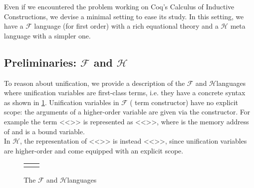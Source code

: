 \documentclass[sigconf,natbib=false,review]{acmart}
\newcommand{\llambda}{\ensuremath{\mathcal{L}}\xspace}
\newcommand{\Fo}{\texorpdfstring{\ensuremath{\mathcal{F}\xspace}}{F}} %
\newcommand{\Ho}{\texorpdfstring{\ensuremath{\mathcal{H}}\xspace}{H}}
\begin{document}
\newcommand{\maybeeta}{\texorpdfstring{\ensuremath{\Diamond\eta}\xspace}{maybeeta}}
\newcommand{\maybebeta}{\texorpdfstring{\ensuremath{\Diamond\beta}\xspace}{maybebeta}}
\newcommand{\notllambda}{\texorpdfstring{\ensuremath{\Diamond\llambda}\xspace}{maybellam}}

Even if we encountered the problem working on Coq's Calculus of Inductive
Constructions, we devise
a minimal setting to ease its study. In this setting, we have
a \Fo{} language (for first order) with a rich equational
theory and a \Ho{} meta language with a simpler one.


\subsection{Preliminaries: \Fo{} and \Ho{}}

To reason about unification, we provide a description of the
\Fo{} and \Ho languages where unification variables
are first-class terms, i.e. they have a concrete syntax as
shown in \cref{code:common-terms}.
Unification variables
in \Fo{} ( term constructor) have no explicit scope:
the arguments of a higher-order variable are given via the 
constructor. For example the term <<>> is represented as
<<>>, where  is the memory address
of  and  is a bound variable.\\
In \Ho, the representation of <<>> is instead <<>>,
since unification variables are higher-order and come equipped with an
explicit scope.
%
%
{
\setlength{\abovecaptionskip}{0pt}
\setlength{\belowcaptionskip}{-13pt}
\begin{figure}[b] %
  \begin{tabular}{ll}
  \begin{minipage}{0.21\textwidth}
   {code/fo_tm}
  \end{minipage}
  &
  \begin{minipage}{0.24\textwidth}
   {code/ho_tm}
  \end{minipage}
  \end{tabular}\vspace{4pt}
  \caption{The \Fo{} and \Ho languages}\vspace{0.3em}
  \label{code:common-terms}
\end{figure}
}
%
\end{document}
